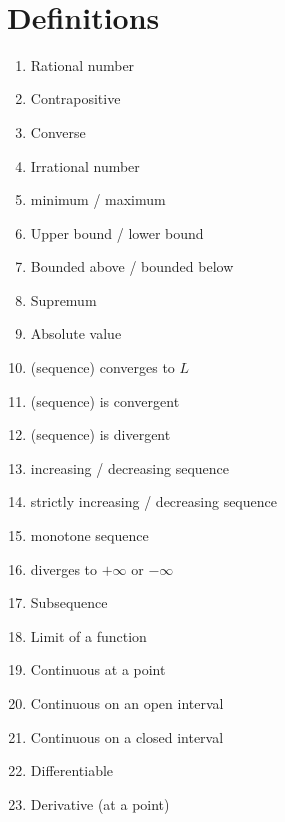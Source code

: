 \documentclass[12pt]{amsart}
\begin{document}

\

\section*{Definitions}

\begin{enumerate}
	\item Rational number
	\item Contrapositive
	\item Converse
	\item Irrational number
	\item minimum / maximum
	\item Upper bound / lower bound
	\item Bounded above / bounded below
	\item Supremum%
			\item Absolute value
	\item (sequence) converges to $L$


	\item (sequence) is convergent
	
	\item (sequence) is divergent

	\item increasing / decreasing sequence
	\item strictly increasing / decreasing sequence
	\item monotone sequence

	\item diverges to $+\infty$ or $-\infty$		
			
	\item Subsequence
	
		


	\item Limit of a function

	\item Continuous at a point

	\item Continuous on an open interval

	\item Continuous on a closed interval
			\item Differentiable
	\item Derivative (at a point)
		\begin{comment}	

	\item Derivative (function)
		\item Increasing/decreasing function

\end{comment}
\end{enumerate}
\end{document}
